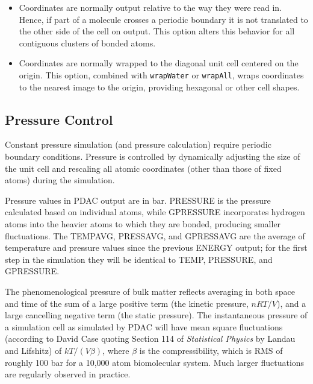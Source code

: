 \begin{itemize}
\item
{}
{Coordinates are normally output relative to the way they were read in.  Hence, if part of a molecule crosses a periodic boundary it is not translated to the other side of the cell on output.  This option alters this behavior for all contiguous clusters of bonded atoms.}

\item
{}
{Coordinates are normally wrapped to the diagonal unit cell centered on the origin.  This option, combined with {\tt wrapWater} or {\tt wrapAll}, wraps coordinates to the nearest image to the origin, providing hexagonal or other cell shapes.}

\end{itemize}

\subsection{Pressure Control}

Constant pressure simulation (and pressure calculation) require periodic
boundary conditions.  Pressure is controlled by dynamically adjusting
the size of the unit cell and rescaling all atomic coordinates (other than
those of fixed atoms) during the simulation.

Pressure values in PDAC output are in bar.
PRESSURE is the pressure calculated based on individual atoms, while
GPRESSURE incorporates hydrogen atoms into the heavier atoms to which
they are bonded, producing smaller fluctuations.
The TEMPAVG, PRESSAVG, and GPRESSAVG are the average of temperature and
pressure values since the previous ENERGY output; for the first step
in the simulation they will be identical to TEMP, PRESSURE, and GPRESSURE.

The phenomenological pressure of bulk matter reflects averaging in both
space and time of the sum of a large positive term (the kinetic pressure,
$nRT/V$), and a large cancelling negative term (the static pressure).
The instantaneous pressure of a simulation cell as simulated by PDAC
will have mean square fluctuations (according to David Case quoting
Section 114 of {\em Statistical Physics} by Landau and Lifshitz)
of $kT/(V \beta)$, where $\beta$ is the compressibility, which is
RMS of roughly 100 bar for a 10,000 atom biomolecular system.
Much larger fluctuations are regularly observed in practice.

